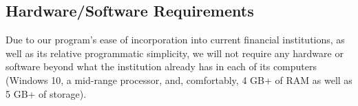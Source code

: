 \subsection{Hardware/Software Requirements}

Due to our program’s ease of incorporation into current financial institutions, as well as its relative programmatic simplicity, we will not require any hardware or software beyond what the institution already has in each of its computers (Windows 10, a mid-range processor, and, comfortably, 4 GB+ of RAM as well as 5 GB+ of storage).   